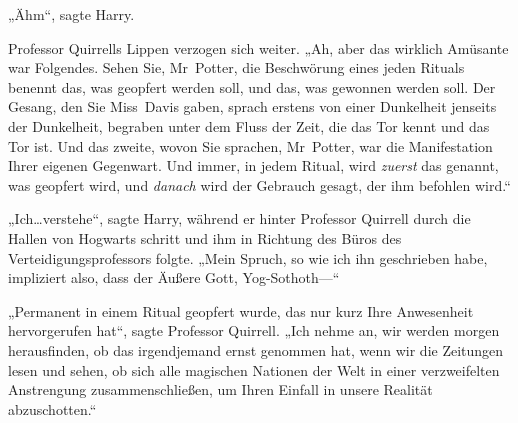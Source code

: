 „Ähm“, sagte Harry.

Professor Quirrells Lippen verzogen sich weiter.
„Ah, aber das wirklich Amüsante war Folgendes. Sehen Sie, Mr~Potter, die Beschwörung eines jeden Rituals benennt das, was geopfert werden soll, und das, was gewonnen werden soll. Der Gesang, den Sie Miss~Davis gaben, sprach erstens von einer Dunkelheit jenseits der Dunkelheit, begraben unter dem Fluss der Zeit, die das Tor kennt und das Tor ist. Und das zweite, wovon Sie sprachen, Mr~Potter, war die Manifestation Ihrer eigenen Gegenwart. Und immer, in jedem Ritual, wird \emph{zuerst} das genannt, was geopfert wird, und \emph{danach} wird der Gebrauch gesagt, der ihm befohlen wird.“

„Ich…verstehe“, sagte Harry, während er hinter Professor Quirrell durch die Hallen von Hogwarts schritt und ihm in Richtung des Büros des Verteidigungsprofessors folgte.
„Mein Spruch, so wie ich ihn geschrieben habe, impliziert also, dass der Äußere Gott, Yog-Sothoth—“

„Permanent in einem Ritual geopfert wurde, das nur kurz Ihre Anwesenheit hervorgerufen hat“, sagte Professor Quirrell.
„Ich nehme an, wir werden morgen herausfinden, ob das irgendjemand ernst genommen hat, wenn wir die Zeitungen lesen und sehen, ob sich alle magischen Nationen der Welt in einer verzweifelten Anstrengung zusammenschließen, um Ihren Einfall in unsere Realität abzuschotten.“

